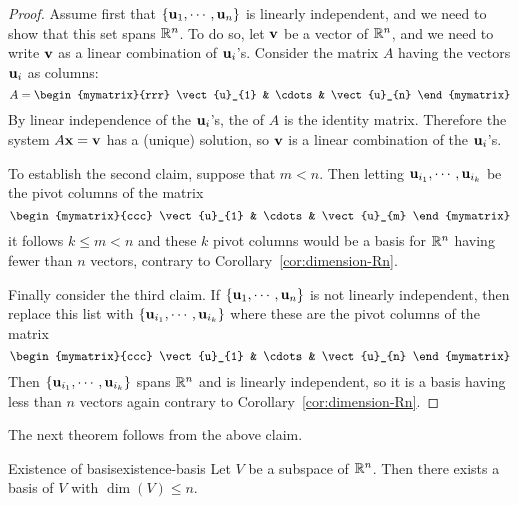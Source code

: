 \begin{proof}
  Assume first that $\left\{\mbox{\bf u}_{1},\cdots ,\mbox{\bf u}_{n}\right\} $ is
  linearly independent, and we need to show that this set spans
  $\mathbb{R}^{n}$. To do so, let $\mbox{\bf v}$ be a vector of $\mathbb{R}^{n}$, and we
  need to write $\mbox{\bf v}$ as a linear combination of $\mbox{\bf u}_i$'s.
  Consider the matrix $A$ having the vectors $\mbox{\bf u}_i$ as columns:
  \begin{equation*}
    A = 
    \begin{mymatrix}{rrr}
      \vect{u}_{1} & \cdots & \vect{u}_{n} 
    \end{mymatrix}
  \end{equation*}
  By linear independence of the $\mbox{\bf u}_i$'s, the {\rref} of $A$ is
  the identity matrix.  Therefore the system $A\mbox{\bf x}= \mbox{\bf v}$ has
  a (unique) solution, so $\mbox{\bf v}$ is a linear combination of the
  $\mbox{\bf u}_i$'s.

  To establish the second claim, suppose that $m<n$. Then letting
  $\mbox{\bf u}_{i_{1}},\cdots ,\mbox{\bf u}_{i_{k}}$ be the pivot columns of
  the matrix
  \begin{equation*}
    \begin{mymatrix}{ccc}
      \vect{u}_{1} & \cdots & \vect{u}_{m}
    \end{mymatrix}
  \end{equation*}
  it follows $k\leq m<n$ and these $k$ pivot columns would be a basis
  for $\mathbb{R}^{n}$ having fewer than $n$ vectors, contrary to
  Corollary~\ref{cor:dimension-Rn}.

  Finally consider the third claim. If $\left\{\mbox{\bf u}_{1},\cdots
    ,\mbox{\bf u}_{n}\right\} $ is not linearly independent, then replace this
  list with $\left\{\mbox{\bf u}_{i_{1}},\cdots ,\mbox{\bf u}_{i_{k}}\right\} $ where these
  are the pivot columns of the matrix 
  \begin{equation*}
    \begin{mymatrix}{ccc}
      \vect{u}_{1} & \cdots & \vect{u}_{n}
    \end{mymatrix}
  \end{equation*}
  Then $\left\{\mbox{\bf u}_{i_{1}},\cdots ,\mbox{\bf u}_{i_{k}}\right\} $ spans
  $\mathbb{R}^{n}$ and is linearly independent, so it is a basis having
  less than $n$ vectors again contrary to Corollary~\ref{cor:dimension-Rn}.
\end{proof}

The next theorem follows from the above claim.

\begin{theorem}{Existence of basis}{existence-basis}
  Let $V$ be a subspace of $\mathbb{R}^n$. Then there exists a basis of $V$ with 
  $\dim(V)\leq n$.
\end{theorem}

